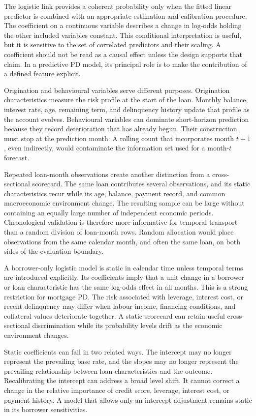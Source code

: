 The logistic link provides a coherent probability only when the fitted linear predictor is combined with an appropriate estimation and calibration procedure. The coefficient on a continuous variable describes a change in log-odds holding the other included variables constant. This conditional interpretation is useful, but it is sensitive to the set of correlated predictors and their scaling. A coefficient should not be read as a causal effect unless the design supports that claim. In a predictive PD model, its principal role is to make the contribution of a defined feature explicit.

Origination and behavioural variables serve different purposes. Origination characteristics measure the risk profile at the start of the loan. Monthly balance, interest rate, age, remaining term, and delinquency history update that profile as the account evolves. Behavioural variables can dominate short-horizon prediction because they record deterioration that has already begun. Their construction must stop at the prediction month. A rolling count that incorporates month $t+1$, even indirectly, would contaminate the information set used for a month-$t$ forecast.

Repeated loan-month observations create another distinction from a cross-sectional scorecard. The same loan contributes several observations, and its static characteristics recur while its age, balance, payment record, and common macroeconomic environment change. The resulting sample can be large without containing an equally large number of independent economic periods. Chronological validation is therefore more informative for temporal transport than a random division of loan-month rows. Random allocation would place observations from the same calendar month, and often the same loan, on both sides of the evaluation boundary.

A borrower-only logistic model is static in calendar time unless temporal terms are introduced explicitly. Its coefficients imply that a unit change in a borrower or loan characteristic has the same log-odds effect in all months. This is a strong restriction for mortgage PD. The risk associated with leverage, interest cost, or recent delinquency may differ when labour income, financing conditions, and collateral values deteriorate together. A static scorecard can retain useful cross-sectional discrimination while its probability levels drift as the economic environment changes.

Static coefficients can fail in two related ways. The intercept may no longer represent the prevailing base rate, and the slopes may no longer represent the prevailing relationship between loan characteristics and the outcome. Recalibrating the intercept can address a broad level shift. It cannot correct a change in the relative importance of credit score, leverage, interest cost, or payment history. A model that allows only an intercept adjustment remains static in its borrower sensitivities.


